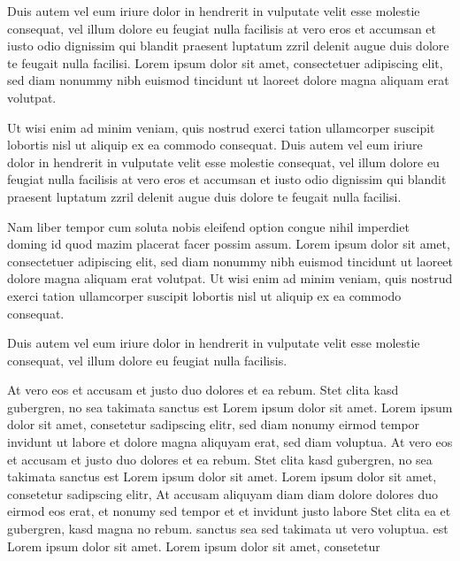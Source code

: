 Duis autem vel eum iriure dolor in hendrerit in vulputate velit esse molestie consequat, vel illum dolore eu feugiat nulla facilisis at vero eros et accumsan et iusto odio dignissim qui blandit praesent luptatum zzril delenit augue duis dolore te feugait nulla facilisi. Lorem ipsum dolor sit amet, consectetuer adipiscing elit, sed diam nonummy nibh euismod tincidunt ut laoreet dolore magna aliquam erat volutpat.   

Ut wisi enim ad minim veniam, quis nostrud exerci tation ullamcorper suscipit lobortis nisl ut aliquip ex ea commodo consequat. Duis autem vel eum iriure dolor in hendrerit in vulputate velit esse molestie consequat, vel illum dolore eu feugiat nulla facilisis at vero eros et accumsan et iusto odio dignissim qui blandit praesent luptatum zzril delenit augue duis dolore te feugait nulla facilisi.   

Nam liber tempor cum soluta nobis eleifend option congue nihil imperdiet doming id quod mazim placerat facer possim assum. Lorem ipsum dolor sit amet, consectetuer adipiscing elit, sed diam nonummy nibh euismod tincidunt ut laoreet dolore magna aliquam erat volutpat. Ut wisi enim ad minim veniam, quis nostrud exerci tation ullamcorper suscipit lobortis nisl ut aliquip ex ea commodo consequat.   

Duis autem vel eum iriure dolor in hendrerit in vulputate velit esse molestie consequat, vel illum dolore eu feugiat nulla facilisis.   

At vero eos et accusam et justo duo dolores et ea rebum. Stet clita kasd gubergren, no sea takimata sanctus est Lorem ipsum dolor sit amet. Lorem ipsum dolor sit amet, consetetur sadipscing elitr, sed diam nonumy eirmod tempor invidunt ut labore et dolore magna aliquyam erat, sed diam voluptua. At vero eos et accusam et justo duo dolores et ea rebum. Stet clita kasd gubergren, no sea takimata sanctus est Lorem ipsum dolor sit amet. Lorem ipsum dolor sit amet, consetetur sadipscing elitr, At accusam aliquyam diam diam dolore dolores duo eirmod eos erat, et nonumy sed tempor et et invidunt justo labore Stet clita ea et gubergren, kasd magna no rebum. sanctus sea sed takimata ut vero voluptua. est Lorem ipsum dolor sit amet. Lorem ipsum dolor sit amet, consetetur